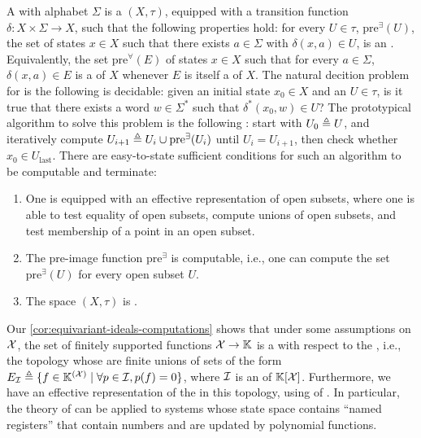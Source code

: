 \AP A  with alphabet
$\Sigma$ is a  $(X, \tau)$, equipped with a transition
function $\delta \colon X \times \Sigma \to X$, such that the following
properties hold: for every $U \in \tau$, $\mathrm{pre}^\exists(U)$, the set of
states $x \in X$ such that there exists $a \in \Sigma$ with $\delta(x, a) \in
U$, is an . Equivalently, the set $\mathrm{pre}^\forall(E)$ of
states $x \in X$ such that for every $a \in \Sigma$, $\delta(x, a) \in E$ is a
 of $X$ whenever $E$ is itself a  of $X$.
The natural decition problem for  is the following  is decidable: given
an initial state $x_0 \in X$ and an  $U \in \tau$, is it true that
there exists a word $w \in \Sigma^*$ such that $\delta^*(x_0, w) \in U$? The
prototypical algorithm to solve this problem is the following : start with $U_0 \triangleq U$, and iteratively compute $U_{i+1}
\triangleq U_i \cup \mathrm{pre}^\exists(U_i)$ until $U_i = U_{i+1}$, then check
whether $x_0 \in U_\text{last}$.
There are easy-to-state sufficient conditions  for such an algorithm to be computable and terminate:
\begin{enumerate}
  \item One is equipped with an effective representation of open subsets,
    where one is able to test equality of open subsets, compute unions of open subsets, and test 
    membership of a point in an open subset.
  \item The pre-image function $\mathrm{pre}^\exists$ is computable, i.e., one can
    compute the set $\mathrm{pre}^\exists(U)$ for every open subset $U$.
  \item The space $(X, \tau)$ is . 
\end{enumerate}

\AP Our \cref{cor:equivariant-ideals-computations} shows that
under some assumptions on $\mathcal{X}$, the set of finitely supported functions
$\mathcal{X} \to \mathbb{K}$ is a  with respect to the
, i.e., the topology whose 
are finite unions of sets of the form $E_{\idl} \defined \setof{f \in
\K^{(\Indets)}}{\forall p \in \idl, p(f) = 0}$, where $\idl$ is an
 of $\mathbb{K}[\mathcal{X}]$. Furthermore, we have an
effective representation of the  in this topology, using
 of . In particular, the
theory of  can be applied to
systems whose state space contains ``named registers'' that contain numbers and
are updated by polynomial functions.


